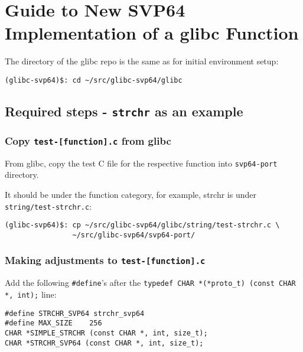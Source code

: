 %

\chapter{Guide to New \acrshort{SVP64} Implementation of a glibc Function}
\label{sec:adding_new_func}

The directory of the glibc repo is the same as for initial environment setup:

\begin{verbatim}
(glibc-svp64)$: cd ~/src/glibc-svp64/glibc
\end{verbatim}

\section{Required steps - \texttt{strchr} as an example}

\subsection{Copy \texttt{test-[function].c} from glibc}

From glibc, copy the test C file for the respective function
into \texttt{svp64-port} directory.

It should be under the function category, for example, strchr is
under \texttt{string/test-strchr.c}:

\begin{verbatim}
(glibc-svp64)$: cp ~/src/glibc-svp64/glibc/string/test-strchr.c \
                ~/src/glibc-svp64/svp64-port/
\end{verbatim}

\subsection{Making adjustments to \texttt{test-[function].c}}

Add the following \texttt{\#define}'s after the
\texttt{typedef CHAR *(*proto\_t) (const CHAR *, int);} line:

\begin{verbatim}
#define STRCHR_SVP64 strchr_svp64
#define MAX_SIZE    256
CHAR *SIMPLE_STRCHR (const CHAR *, int, size_t);
CHAR *STRCHR_SVP64 (const CHAR *, int, size_t);
\end{verbatim}


